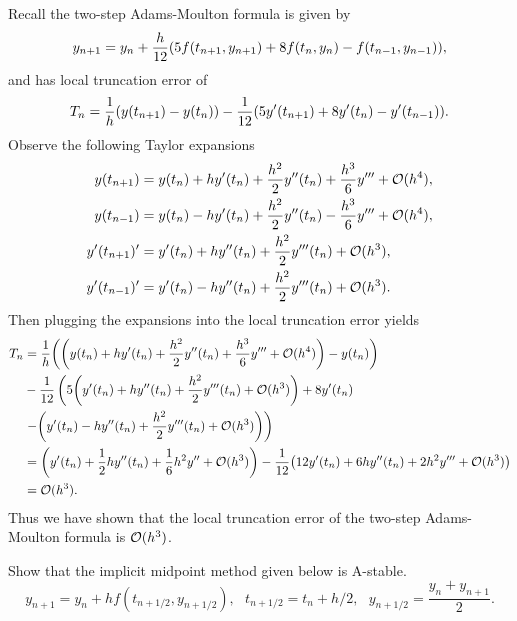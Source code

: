 \documentclass[12pt]{report}
\begin{document}
\begin{solution}

    \noindent
    Recall the two-step Adams-Moulton formula is given by
    \[ 
        y_{n+1} = y_n + \frac{h}{12} {\left(5f(t_{n+1},y_{n+1}) + 8f(t_n, y_n) - f(t_{n-1},y_{n-1})\right)},
    \] 
    and has local truncation error of
    \[ 
        T_n = \frac{1}{h}{\left(y(t_{n+1}) - y(t_n)\right)} - \frac{1}{12}{\left(5y'(t_{n+1}) + 8y'(t_n) - y'(t_{n-1})\right)}.
    \]
    Observe the following Taylor expansions
    \begin{align*}
        y(t_{n+1}) &= y(t_n) + hy'(t_n) + \frac{h^2}{2}y''(t_n) + \frac{h^3}{6}y''' + {\mathcal{O}}(h^4),\\
        y(t_{n-1}) &= y(t_n) - hy'(t_n) + \frac{h^2}{2}y''(t_n) - \frac{h^3}{6}y''' + {\mathcal{O}}(h^4),\\
        y'(t_{n+1})' &= y'(t_n) + hy''(t_n) + \frac{h^2}{2}y'''(t_n) + {\mathcal{O}}(h^3),\\
        y'(t_{n-1})' &= y'(t_n) - hy''(t_n) + \frac{h^2}{2}y'''(t_n) + {\mathcal{O}}(h^3).
    \end{align*}
    Then plugging the expansions into the local truncation error yields
    \begin{align*}
        T_n &= \frac{1}{h} {\left( {\left(y(t_n) + hy'(t_n) + \frac{h^2}{2}y''(t_n) + \frac{h^3}{6}y''' + {\mathcal{O}}(h^4)\right)} - y(t_n)\right)}\\
        &- \frac{1}{12} \left( 5{\left(y'(t_n) + hy''(t_n) + \frac{h^2}{2}y'''(t_n) + {\mathcal{O}}(h^3)\right)} + 8y'(t_n) \right.\\ 
        &\left. -{\left(y'(t_n) - hy''(t_n) + \frac{h^2}{2}y'''(t_n) + {\mathcal{O}}(h^3)\right)} \right)\\
        &= {\left(y'(t_n) + \frac{1}{2}h y''(t_n) + \frac{1}{6}h^2y'' + {\mathcal{O}}(h^3)\right)} - \frac{1}{12}{\left(12y'(t_n) + 6hy''(t_n) + 2h^2y''' + {\mathcal{O}}(h^3)\right)}\\
        &= {\mathcal{O}}(h^3).
    \end{align*}
    Thus we have shown that the local truncation error of the two-step Adams-Moulton formula is ${\mathcal{O}}(h^3)$. 


\end{solution}

\newpage



\begin{problem}
    Show that the implicit midpoint method given below is A-stable.
    \[ 
        y_{n+1} = y_n + hf(t_{n + 1/2},y_{n + 1/2}), ~~~ t_{n + 1/2} = t_n + h/2, ~~~ y_{n + 1/2} = \frac{y_n + y_{n+1}}{2}.
    \]
\end{problem}
\end{document}
